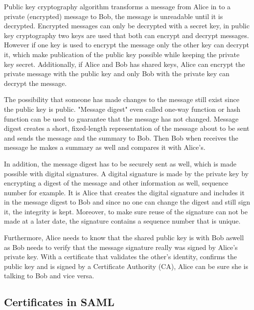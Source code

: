 Public key cryptography algorithm transforms a message from Alice in to a private (encrypted) message to Bob, 
the message is unreadable until it is decrypted. 
Encrypted messages can only be decrypted with a secret key, in public key cryptography two keys are used that both can encrypt and 
decrypt messages. 
However if one key is used to encrypt the message only the other key can decrypt it, which make publication of the public key 
possible while keeping the private key secret. 
Additionally, if Alice and Bob has shared keys, Alice can encrypt the private message with the public key and only Bob 
with the private key can decrypt the message.

The possibility that someone has made changes to the message still exist since the public key is public. 
"Message digest" even called one-way function or hash function can be used to guarantee that the message has not changed. 
Message digest creates a short, fixed-length representation of the message about to be sent and sends the message and
the summary to Bob.
Then Bob when receives the message he makes a summary as well and compares it with Alice's.

In addition, the message digest has to be securely sent as well, which is made possible with digital signatures. A digital signature
is made by the private key by encrypting a digest of the message and other information as well, sequence number for example.
It is Alice that creates the digital signature and includes it in the message digest to Bob and since no one can change the digest and still 
sign it, the integrity is kept. Moreover, to make sure reuse of the signature can not be made at a later date, the signature contains a 
sequence number that is unique. 

Furthermore, Alice needs to know that the shared public key is with Bob aswell as Bob needs to verify that the message signature 
really was signed by Alice's private key. With a certificate that validates the other's identity, confirms the public key and
is signed by a Certificate Authority (CA), Alice can be sure she is talking to Bob and vice versa.

\subsection{Certificates in SAML}

